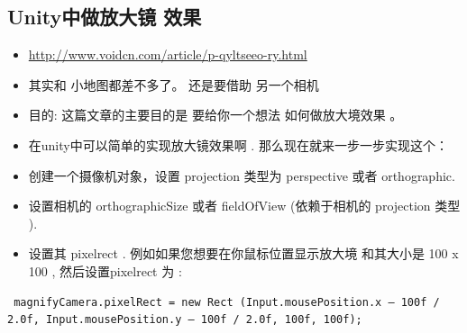 \documentclass[9pt, b5paper]{article}
\begin{document}
\subsection{Unity中做放大镜 效果}
\label{sec:org8982ca3}
\begin{itemize}
\item \url{http://www.voidcn.com/article/p-qyltseeo-ry.html}
\item 其实和 小地图都差不多了。  还是要借助 另一个相机
\item 目的: 这篇文章的主要目的是  要给你一个想法  如何做放大境效果 。
\item 在unity中可以简单的实现放大镜效果啊 . 那么现在就来一步一步实现这个：
\item 创建一个摄像机对象，设置 projection 类型为 perspective 或者 orthographic.
\item 设置相机的 orthographicSize 或者 fieldOfView   (依赖于相机的 projection 类型 ).
\item 设置其 pixelrect  . 例如如果您想要在你鼠标位置显示放大境  和其大小是 100 x 100 , 然后设置pixelrect 为 :
\end{itemize}
\begin{verbatim}
 magnifyCamera.pixelRect = new Rect (Input.mousePosition.x – 100f / 2.0f, Input.mousePosition.y – 100f / 2.0f, 100f, 100f);
\end{verbatim}
\end{document}
